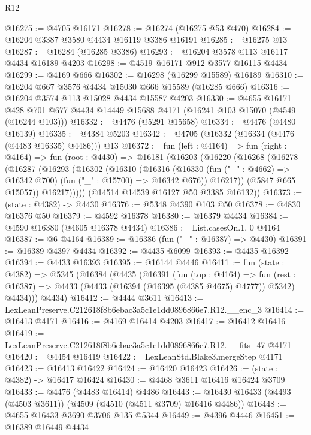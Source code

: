 \begin{lexlean}{R12}
\begin{coremodule}
@16275 := @4705 @16171
@16278 := @16274 (@16275 @53 @470)
@16284 := @16204 @3387 @3580 @4434 @16119 @3386 @16191
@16285 := @16275 @13
@16287 := @16284 (@16285 @3386)
@16293 := @16204 @3578 @113 @16117 @4434 @16189 @4203
@16298 := @4519 @16171 @912 @3577 @16115 @4434
@16299 := @4169 @666
@16302 := @16298 (@16299 @15589) @16189
@16310 := @16204 @667 @3576 @4434 @15030 @666 @15589 (@16285 @666)
@16316 := @16204 @3574 @113 @15028 @4434 @15587 @4203
@16330 := @4655
    @16171
    @428
    @701
    @677
    @4434
    @14449
    @15688
    @4171
    (@16241 @103 @15070 (@4549 (@16244 @103)))
@16332 := @4476 (@5291 @15658)
@16334 := @4476 (@4480 @16139)
@16335 := @4384 @5203
@16342 := @4705 (@16332 (@16334 (@4476 (@4483 @16335) @4486))) @13
@16372 := fun (left : @4164) =>
  fun (right : @4164) =>
  fun (root : @4430) =>
  @16181
    (@16203
      (@16220
        (@16268
          (@16278
            (@16287
              (@16293
                (@16302
                  (@16310
                    (@16316
                      (@16330
                        (fun ("_" : @4662) => @16342 @700)
                        (fun ("_" : @15700) => @16342 @676))
                      @16217))
                  (@5847 @665 @15057))
                @16217)))))
      (@14514 @14539 @16127 @50 @3385 @16132))
@16373 := (state : @4382) -> @4430
@16376 := @5348 @4390 @103 @50
@16378 := @4830 @16376 @50
@16379 := @4592 @16378
@16380 := @16379 @4434
@16384 := @4590 @16380 (@4605 @16378 @4434)
@16386 := List.casesOn.{1, 0} @4164
@16387 := @6 @4164
@16389 := @16386 (fun ("_" : @16387) => @4430)
@16391 := @16389 @4397 @4434
@16392 := @4435 @6099
@16393 := @4435 @16392
@16394 := @4433 @16393
@16395 := @16144 @4446
@16411 := fun (state : @4382) =>
  @5345
    (@16384
      (@4435
        (@16391
          (fun (top : @4164) =>
          fun (rest : @16387) => @4433 (@4433 (@16394 (@16395 (@4385 @4675) @4777)) @5342) @4434)))
      @4434)
@16412 := @4444 @3611
@16413 := LexLeanPreserve.C212618f8b6ebac3a5c1e1dd0896866e7.R12.__enc_3
@16414 := @16413 @4171
@16416 := @4169 @16414 @4203
@16417 := @16412 @16416
@16419 := LexLeanPreserve.C212618f8b6ebac3a5c1e1dd0896866e7.R12.__fits_47 @4171
@16420 := @4454 @16419
@16422 := LexLeanStd.Blake3.mergeStep @4171
@16423 := @16413 @16422
@16424 := @16420 @16423
@16426 := (state : @4382) -> @16417 @16424
@16430 := @4468 @3611 @16416 @16424 @3709
@16433 := @4476 (@4483 @16414) @4486
@16443 := @16430 @16433 (@4493 (@4503 @3611)) (@4509 (@4510 (@4511 @3709) @16416 @4486))
@16448 := @4655 @16433 @3690 @3706 @135 @5344
@16449 := @4396 @4446
@16451 := @16389 @16449 @4434

\end{coremodule}
\end{lexlean}
